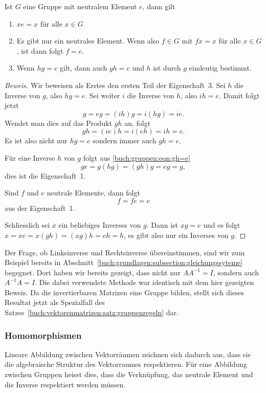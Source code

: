 \begin{satz}
\label{buch:vektorenmatrizen:satz:gruppenregeln}
Ist $G$ eine Gruppe mit neutralem Element $e$, dann gilt
\begin{enumerate}
\item
$xe=x$ für alle $x\in G$
\item
Es gibt nur ein neutrales Element.
%
Wenn also $f\in G$ mit $fx=x$ für alle $x\in G$, ist dann folgt $f=e$.
\item 
Wenn $hg=e$ gilt, dann auch $gh=e$ und $h$ ist durch $g$ eindeutig bestimmt.
\end{enumerate}
\end{satz}

\begin{proof}[Beweis]
Wir beweisen als Erstes den ersten Teil der Eigenschaft~3.
Sei $h$ die Inverse von $g$, also $hg=e$.
Sei weiter $i$ die Inverse von $h$, also $ih=e$.
Damit folgt jetzt
\[
g
=
eg
=
(ih)g
=
i(hg)
=
ie.
\]
Wendet man dies auf das Produkt $gh$ an, folgt
\begin{equation}
gh
=
(ie)h
=
i(eh)
=
ih
=
e.
\label{buch:gruppen:eqn:gh=e}
\end{equation}
Es ist also nicht nur $hg=e$ sondern immer auch $gh=e$.

Für eine Inverse $h$ von $g$ folgt
aus \eqref{buch:gruppen:eqn:gh=e}
\[
ge
=
g(hg)
=
(gh)g
=
eg
=
g,
\]
dies ist die Eigenschaft~1.

Sind $f$ und $e$ neutrale Elemente, dann folgt
\[
f = fe = e
\]
aus der Eigenschaft~1.

Schliesslich sei $x$ ein beliebiges Inverses von $g$.
Dann ist $xg=e$ und es folgt
$x=xe=x(gh)=(xg)h = eh = h$, es gibt also nur ein Inverses von $g$.
\end{proof}

Der Frage, ob Linksinverse und Rechtsinverse übereinstimmen,
sind wir zum Beispiel bereits in
Abschnitt~\ref{buch:grundlagen:subsection:gleichungssyteme}
begegnet.
Dort haben wir bereits gezeigt, dass nicht nur $AA^{-1}=I$,
sondern auch $A^{-1}A=I$.
Die dabei verwendete Methode war identisch mit dem hier gezeigten
Beweis.
Da die invertierbaren Matrizen eine Gruppe bilden, stellt sich
dieses Resultat jetzt als Spezialfall des
Satzes~\ref{buch:vektorenmatrizen:satz:gruppenregeln} dar.

\subsubsection{Homomorphismen} \label{buch:gruppen:subsection:homomorphismen}
Lineare Abbildung zwischen Vektorräumen zeichnen sich dadurch aus,
dass sie die algebraische Struktur des Vektorraumes respektieren.
Für eine Abbildung zwischen Gruppen heisst dies, dass die Verknüpfung,
das neutrale Element und die Inverse respektiert werden müssen.

